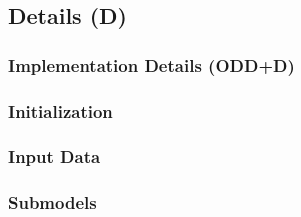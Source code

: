 \subsection{Details (D)}

\subsubsection{Implementation Details (ODD+D)}

\begin{guidingbox}
\end{guidingbox}

\subsubsection{Initialization}

\begin{guidingbox}
\end{guidingbox}

\subsubsection{Input Data}

\begin{guidingbox}
\end{guidingbox}

\subsubsection{Submodels}

\begin{guidingbox}
\end{guidingbox}



